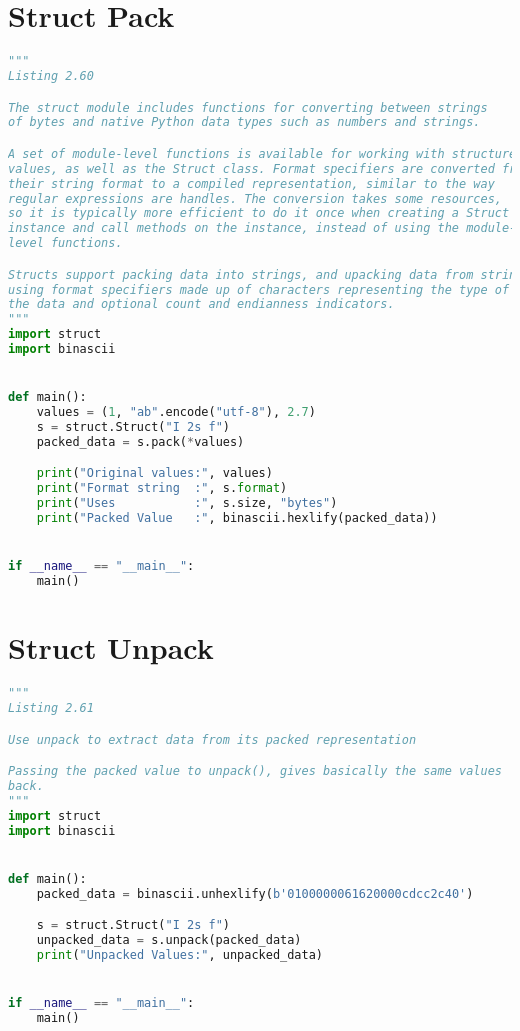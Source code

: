 \documentclass[a4paper,landscape]{report}
\begin{document}
\section{Struct Pack}
\begin{lstlisting}[language=Python]
"""
Listing 2.60

The struct module includes functions for converting between strings
of bytes and native Python data types such as numbers and strings.

A set of module-level functions is available for working with structured
values, as well as the Struct class. Format specifiers are converted from
their string format to a compiled representation, similar to the way
regular expressions are handles. The conversion takes some resources,
so it is typically more efficient to do it once when creating a Struct
instance and call methods on the instance, instead of using the module-
level functions.

Structs support packing data into strings, and upacking data from strings
using format specifiers made up of characters representing the type of
the data and optional count and endianness indicators.
"""
import struct
import binascii


def main():
    values = (1, "ab".encode("utf-8"), 2.7)
    s = struct.Struct("I 2s f")
    packed_data = s.pack(*values)

    print("Original values:", values)
    print("Format string  :", s.format)
    print("Uses           :", s.size, "bytes")
    print("Packed Value   :", binascii.hexlify(packed_data))


if __name__ == "__main__":
    main()

\end{lstlisting}
\section{Struct Unpack}
\begin{lstlisting}[language=Python]
"""
Listing 2.61

Use unpack to extract data from its packed representation

Passing the packed value to unpack(), gives basically the same values
back.
"""
import struct
import binascii


def main():
    packed_data = binascii.unhexlify(b'0100000061620000cdcc2c40')

    s = struct.Struct("I 2s f")
    unpacked_data = s.unpack(packed_data)
    print("Unpacked Values:", unpacked_data)


if __name__ == "__main__":
    main()

\end{lstlisting}
\end{document}
